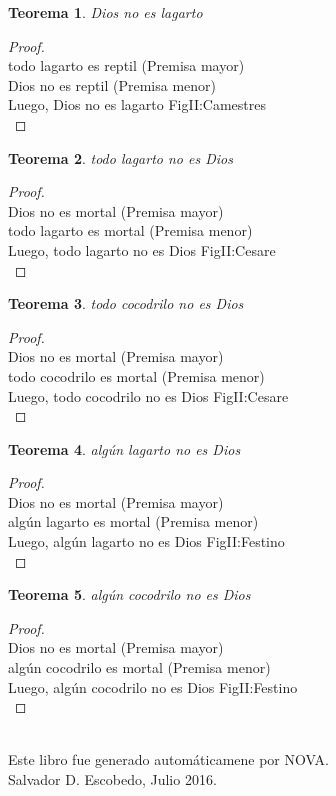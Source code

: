 ﻿\documentclass[12pt]{book}
\newtheorem{theorem}{Teorema}[chapter]
\newtheorem{proof}{Demostración}
\begin{document}
\begin{theorem}
Dios no es lagarto
\label{th: 119}
\end{theorem}\begin{proof}\\todo lagarto es reptil	 (Premisa mayor) \\Dios no es reptil	 (Premisa menor) \\Luego, Dios no es lagarto	FigII:Camestres \\ \end{proof}
\begin{theorem}
todo lagarto no es Dios
\label{th: 120}
\end{theorem}\begin{proof}\\Dios no es mortal	 (Premisa mayor) \\todo lagarto es mortal	 (Premisa menor) \\Luego, todo lagarto no es Dios	FigII:Cesare \\ \end{proof}
\begin{theorem}
todo cocodrilo no es Dios
\label{th: 121}
\end{theorem}\begin{proof}\\Dios no es mortal	 (Premisa mayor) \\todo cocodrilo es mortal	 (Premisa menor) \\Luego, todo cocodrilo no es Dios	FigII:Cesare \\ \end{proof}
\begin{theorem}
algún lagarto no es Dios
\label{th: 122}
\end{theorem}\begin{proof}\\Dios no es mortal	 (Premisa mayor) \\algún lagarto es mortal	 (Premisa menor) \\Luego, algún lagarto no es Dios	FigII:Festino \\ \end{proof}
\begin{theorem}
algún cocodrilo no es Dios
\label{th: 123}
\end{theorem}\begin{proof}\\Dios no es mortal	 (Premisa mayor) \\algún cocodrilo es mortal	 (Premisa menor) \\Luego, algún cocodrilo no es Dios	FigII:Festino \\ \end{proof}
\\\small{Este libro fue generado automáticamene por NOVA.} \\
\small{Salvador D. Escobedo, Julio 2016}.
\end{document}
